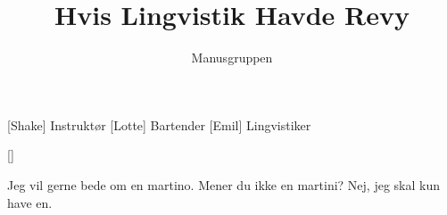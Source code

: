 \documentclass[a4paper,11pt]{article}
\title{Hvis Lingvistik Havde Revy}
\author{Manusgruppen}
\begin{document}
\maketitle

\begin{roles}
[Shake] Instruktør
[Lotte] Bartender
[Emil] Lingvistiker
\end{roles}

\begin{props}
[]
\end{props}


\begin{sketch}

 Jeg vil gerne bede om en martino.
 Mener du ikke en martini?
 Nej, jeg skal kun have en.



\end{sketch}
\end{document}
